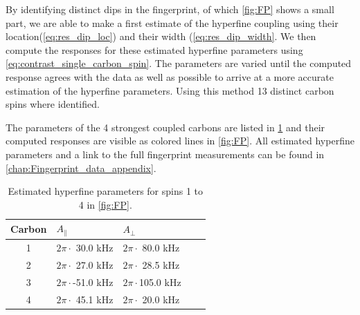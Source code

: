 By identifying distinct dips in the fingerprint, of which \cref{fig:FP} shows a small part, we are able to make a first estimate of the hyperfine coupling using their location(\cref{eq:res_dip_loc}) and their width (\cref{eq:res_dip_width}.
We then compute the responses for these estimated hyperfine parameters using \cref{eq:contrast_single_carbon_spin}.
The parameters are varied until the computed response agrees with the data as well as possible to arrive at a more accurate estimation of the hyperfine parameters.
Using this method 13 distinct carbon spins where identified.

The parameters of the 4 strongest coupled carbons are listed in \cref{tbl:HF_par} and their computed responses are visible as colored lines in \cref{fig:FP}.
All estimated hyperfine parameters and a link to the full fingerprint measurements can be found in \cref{chap:Fingerprint_data_appendix}.

\begin{table}[htbp]
\centering
    \begin{tabular}{cllll}
    Carbon & \quad \quad  $A_{\parallel} $ & \quad \quad $A_{\perp}$ \\ \hline
    1         & $2 \pi \cdot${ }30.0 kHz             & $2 \pi \cdot${ }80.0 kHz                \\
    2         & $2 \pi \cdot${ }27.0 kHz             & $2 \pi \cdot${ }28.5 kHz              \\
    3         & $2 \pi \cdot$-51.0 kHz          & $2 \pi \cdot$105.0 kHz              \\
    4         & $2 \pi \cdot${ }45.1 kHz           & $2 \pi \cdot${ }20.0 kHz                \\
    \end{tabular}
    \caption{Estimated hyperfine parameters for spins 1 to 4 in \cref{fig:FP}.}
    \label{tbl:HF_par}
\end{table}
